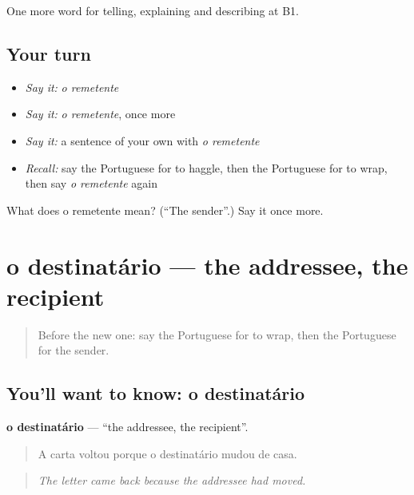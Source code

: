 \begin{grammarlens}[title={What you've built}]
One more word for telling, explaining and describing at B1.
\end{grammarlens}

\subsection*{Your turn}
\begin{itemize}
\raggedright
  \item \emph{Say it:} \emph{o remetente}
  \item \emph{Say it:} \emph{o remetente}, once more
  \item \emph{Say it:} a sentence of your own with \emph{o remetente}
  \item \emph{Recall:} say the Portuguese for to haggle, then the Portuguese for to wrap, then say \emph{o remetente} again
\end{itemize}

\begin{tcolorbox}[breakable,colback=teal!4,colframe=teal!35!black,title={Before you move on}]
What does o remetente mean? (\textquotedblleft{}The sender\textquotedblright{}.) Say it once more.
\end{tcolorbox}
\section[o destinatário]{o destinatário — the addressee, the recipient}

\label{lesson:PT-C454-destinatario}



\begin{quote}
Before the new one: say the Portuguese for to wrap, then the Portuguese for the sender.
\end{quote}

\subsection*{You'll want to know: o destinatário}
\textbf{o destinatário} — \textquotedblleft{}the addressee, the recipient\textquotedblright{}.

\begin{quote}
A carta voltou porque o destinatário mudou de casa.
\end{quote}

\begin{quote}
\emph{The letter came back because the addressee had moved.}
\end{quote}

